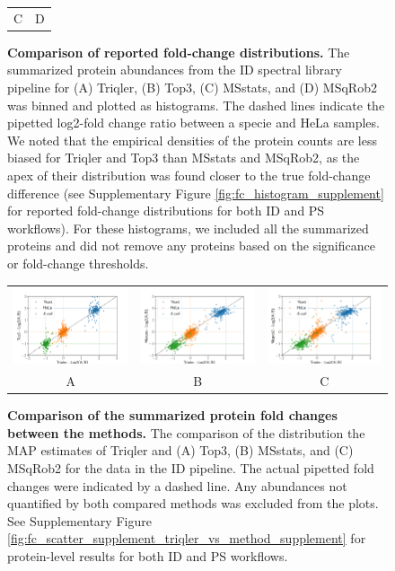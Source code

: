 \documentclass[10pt,letterpaper]{article}
\begin{document}
\begin{figure}[hbt]
\begin{tabular}{cc}
        C & D 
    \end{tabular}
    \caption{{\bf Comparison of reported fold-change distributions.} The summarized protein abundances from the ID spectral library pipeline for (A) Triqler, (B) Top3, (C) MSstats, and (D) MSqRob2 was binned and plotted as histograms. The dashed lines indicate the pipetted log2-fold change ratio between a specie and HeLa samples. We noted that the empirical densities of the protein counts are less biased for Triqler and Top3 than MSstats and MSqRob2, as the apex of their distribution was found closer to the true fold-change difference (see Supplementary Figure \ref{fig:fc_histogram_supplement} for reported fold-change distributions for both ID and PS workflows). For these histograms, we included all the summarized proteins and did not remove any proteins based on  the significance or fold-change thresholds. \label{fig:fc_histogram}}
\end{figure}


\begin{figure}[hbt]
    \centering
    \begin{tabular}{ccc}
        \includegraphics[width=0.33\linewidth]{../../result/report_plots_pipeline/scatter_ID_triqler_vs_top3.png} & 
        \includegraphics[width=0.33\linewidth]{../../result/report_plots_pipeline/scatter_ID_triqler_vs_msstats.png} & 
        \includegraphics[width=0.33\linewidth]{../../result/report_plots_pipeline/scatter_ID_triqler_vs_msqrob2.png} \\
        A & B & C
    \end{tabular}
    \caption{{\bf Comparison of the summarized protein fold changes between the methods.} The comparison of the distribution the MAP estimates of Triqler and  (A) Top3, (B) MSstats, and (C) MSqRob2 for the data in the ID pipeline.  The actual pipetted fold changes were indicated by a dashed line. Any abundances not quantified by both compared methods was excluded from the plots. See Supplementary Figure \ref{fig:fc_scatter_supplement_triqler_vs_method_supplement} for protein-level results for both ID and PS workflows. \label{fig:fc_scatter}}
\end{figure}
\end{document}
